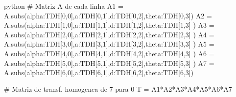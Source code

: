 \begin{mintedbox}{python}
# Matriz A de cada linha
A1 = A.subs({alpha:TDH[0,0],a:TDH[0,1],d:TDH[0,2],theta:TDH[0,3]})
A2 = A.subs({alpha:TDH[1,0],a:TDH[1,1],d:TDH[1,2],theta:TDH[1,3] })
A3 = A.subs({alpha:TDH[2,0],a:TDH[2,1],d:TDH[2,2],theta:TDH[2,3] })
A4 = A.subs({alpha:TDH[3,0],a:TDH[3,1],d:TDH[3,2],theta:TDH[3,3] })
A5 = A.subs({alpha:TDH[4,0],a:TDH[4,1],d:TDH[4,2],theta:TDH[4,3] })
A6 = A.subs({alpha:TDH[5,0],a:TDH[5,1],d:TDH[5,2],theta:TDH[5,3] })
A7 = A.subs({alpha:TDH[6,0],a:TDH[6,1],d:TDH[6,2],theta:TDH[6,3]})

# Matriz de transf. homogenea de 7 para 0
T = A1*A2*A3*A4*A5*A6*A7
\end{mintedbox}